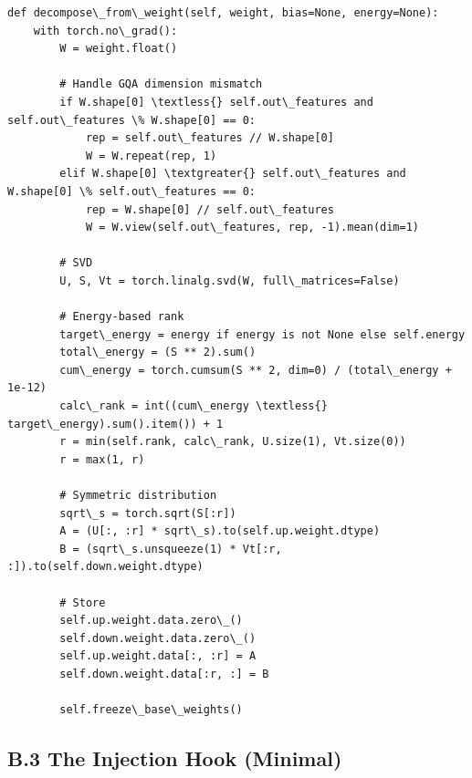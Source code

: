 \begin{lstlisting}
def decompose\_from\_weight(self, weight, bias=None, energy=None):
    with torch.no\_grad():
        W = weight.float()
        
        # Handle GQA dimension mismatch
        if W.shape[0] \textless{} self.out\_features and self.out\_features \% W.shape[0] == 0:
            rep = self.out\_features // W.shape[0]
            W = W.repeat(rep, 1)
        elif W.shape[0] \textgreater{} self.out\_features and W.shape[0] \% self.out\_features == 0:
            rep = W.shape[0] // self.out\_features
            W = W.view(self.out\_features, rep, -1).mean(dim=1)
        
        # SVD
        U, S, Vt = torch.linalg.svd(W, full\_matrices=False)
        
        # Energy-based rank
        target\_energy = energy if energy is not None else self.energy
        total\_energy = (S ** 2).sum()
        cum\_energy = torch.cumsum(S ** 2, dim=0) / (total\_energy + 1e-12)
        calc\_rank = int((cum\_energy \textless{} target\_energy).sum().item()) + 1
        r = min(self.rank, calc\_rank, U.size(1), Vt.size(0))
        r = max(1, r)
        
        # Symmetric distribution
        sqrt\_s = torch.sqrt(S[:r])
        A = (U[:, :r] * sqrt\_s).to(self.up.weight.dtype)
        B = (sqrt\_s.unsqueeze(1) * Vt[:r, :]).to(self.down.weight.dtype)
        
        # Store
        self.up.weight.data.zero\_()
        self.down.weight.data.zero\_()
        self.up.weight.data[:, :r] = A
        self.down.weight.data[:r, :] = B
        
        self.freeze\_base\_weights()
\end{lstlisting}

\subsection{B.3 The Injection Hook (Minimal)}

